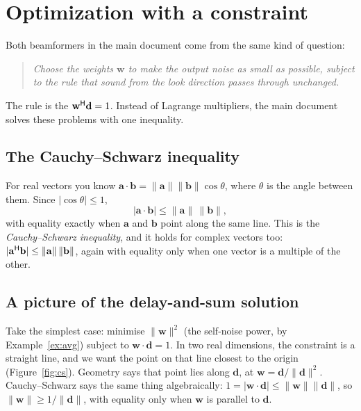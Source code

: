 \documentclass[11pt]{article}
\begin{document}
\section{Optimization with a constraint}\label{sec:opt}

Both beamformers in the main document come from the same kind of question:
\begin{quote}
\emph{Choose the weights $\mathbf w$ to make the output noise as small as possible, subject to the
rule that sound from the look direction passes through unchanged.}
\end{quote}
The rule is the  $\mathbf w^{\mathsf H}\mathbf d=1$.
Instead of Lagrange multipliers, the main document solves these problems with one inequality.

\subsection{The Cauchy--Schwarz inequality}

For real vectors you know $\mathbf a\cdot\mathbf b=\|\mathbf a\|\|\mathbf b\|\cos\theta$, where $\theta$
is the angle between them. Since $|\cos\theta|\le1$,
\begin{equation}\label{eq:cs}
  |\mathbf a\cdot\mathbf b|\le\|\mathbf a\|\,\|\mathbf b\|,
\end{equation}
with equality exactly when $\mathbf a$ and $\mathbf b$ point along the same line. This is the
\emph{Cauchy--Schwarz inequality}, and it holds for complex vectors too:
$|\mathbf a^{\mathsf H}\mathbf b|\le\|\mathbf a\|\,\|\mathbf b\|$, again with equality only when one
vector is a multiple of the other.

\subsection{A picture of the delay-and-sum solution}

Take the simplest case: minimise $\|\mathbf w\|^2$ (the self-noise power, by
Example~\ref{ex:avg}) subject to $\mathbf w\cdot\mathbf d=1$. In two real dimensions, the
constraint is a straight line, and we want the point on that line closest to the origin
(Figure~\ref{fig:cs}). Geometry says that point lies along $\mathbf d$, at
$\mathbf w=\mathbf d/\|\mathbf d\|^2$. Cauchy--Schwarz says the same thing algebraically:
$1=|\mathbf w\cdot\mathbf d|\le\|\mathbf w\|\|\mathbf d\|$, so $\|\mathbf w\|\ge1/\|\mathbf d\|$,
with equality only when $\mathbf w$ is parallel to $\mathbf d$.
\end{document}
